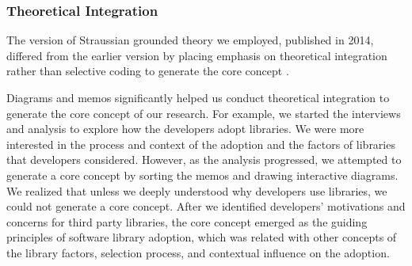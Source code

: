 \subsubsection{Theoretical Integration} 
The version of Straussian grounded theory we employed, published in 2014, differed from the earlier version by placing emphasis on theoretical integration rather than selective coding to generate the core concept \cite{strauss1998basics,corbin2014gt}.

Diagrams and memos significantly helped us conduct theoretical integration to generate the core concept of our research. For example, we started the interviews and analysis to explore how the developers adopt libraries. We were more interested in the process and context of the adoption and the factors of libraries that developers considered. However, as the analysis progressed, we attempted to generate a core concept by sorting the memos and drawing interactive diagrams. We realized that unless we deeply understood why developers use libraries, we could not generate a core concept. After we identified developers' motivations and concerns for third party libraries, the core concept emerged as the guiding principles of software library adoption, which was related with other concepts of the library factors, selection process, and contextual influence on the adoption.



